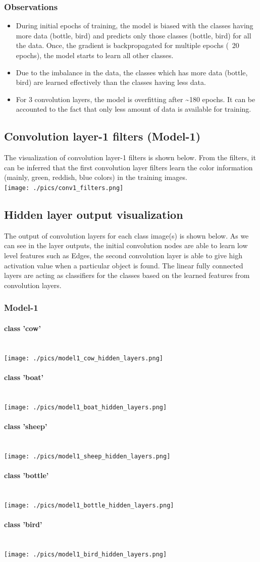 \documentclass[fleqn]{article}
\newcommand{\myparagraph}[1]{\paragraph{#1}\mbox{}\\}
\begin{document}
\subsubsection{Observations}

\begin{itemize}
  \item During initial epochs of training, the model is biased with the classes having more data (bottle, bird) and predicts only those classes (bottle, bird) for all the data.
Once, the gradient is backpropagated for multiple epochs (~20 epochs), the model starts to learn all other classes.
 \item Due to the imbalance in the data, the classes which has more data (bottle, bird) are learned effectively than the classes having less data.
  \item For 3 convolution layers, the model is overfitting after \textasciitilde180 epochs. It can be accounted to the fact that only less amount of data is available for training.
\end{itemize}

\subsection{Convolution layer-1 filters (Model-1)}
The visualization of convolution layer-1 filters is shown below.
From the filters, it can be inferred that the first convolution layer filters learn the color information (mainly, green, reddish, blue colors) in the training images.\\
\texttt{[image: ./pics/conv1\_filters.png]}\\

\subsection{Hidden layer output visualization}
The output of convolution layers for each class image(s) is shown below.
As we can see in the layer outputs, the initial convolution nodes are able to learn low level features such as Edges, 
the second convolution layer is able to give high activation value when a particular object is found.
The linear fully connected layers are acting as classifiers for the classes based on the learned features from convolution layers.

\subsubsection{Model-1}
\myparagraph{class 'cow'}
\texttt{[image: ./pics/model1\_cow\_hidden\_layers.png]}\\
\myparagraph{class 'boat'}
\texttt{[image: ./pics/model1\_boat\_hidden\_layers.png]}\\
\myparagraph{class 'sheep'}
\texttt{[image: ./pics/model1\_sheep\_hidden\_layers.png]}\\
\myparagraph{class 'bottle'}
\texttt{[image: ./pics/model1\_bottle\_hidden\_layers.png]}\\
\myparagraph{class 'bird'}
\texttt{[image: ./pics/model1\_bird\_hidden\_layers.png]}
\end{document}
